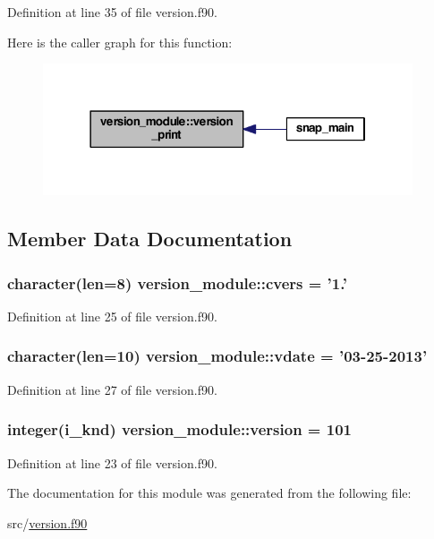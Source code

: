 Definition at line 35 of file version.\-f90.



Here is the caller graph for this function\-:\nopagebreak
\begin{figure}[H]
\begin{center}
\leavevmode
\includegraphics[width=310pt]{classversion__module_a5ed83115741d1afa2856fffc7331a719_icgraph}
\end{center}
\end{figure}




\subsection{Member Data Documentation}
\hypertarget{classversion__module_ad22248c813ff49d5562410a5707d4424}{
\subsubsection[{cvers}]{\setlength{\rightskip}{0pt plus 5cm}character(len=8) version\-\_\-module\-::cvers = '1.'}}\label{classversion__module_ad22248c813ff49d5562410a5707d4424}


Definition at line 25 of file version.\-f90.

\hypertarget{classversion__module_a8ee99e648cd45a2dc8bf148b8e97b32d}{
\subsubsection[{vdate}]{\setlength{\rightskip}{0pt plus 5cm}character(len=10) version\-\_\-module\-::vdate = '03-\/25-\/2013'}}\label{classversion__module_a8ee99e648cd45a2dc8bf148b8e97b32d}


Definition at line 27 of file version.\-f90.

\hypertarget{classversion__module_a55cb5650d5ff58946595f412094ea9ed}{
\subsubsection[{version}]{\setlength{\rightskip}{0pt plus 5cm}integer(i\-\_\-knd) version\-\_\-module\-::version = 101}}\label{classversion__module_a55cb5650d5ff58946595f412094ea9ed}


Definition at line 23 of file version.\-f90.



The documentation for this module was generated from the following file\-:\begin{DoxyCompactItemize}
\item 
src/\hyperlink{version_8f90}{version.\-f90}\end{DoxyCompactItemize}
